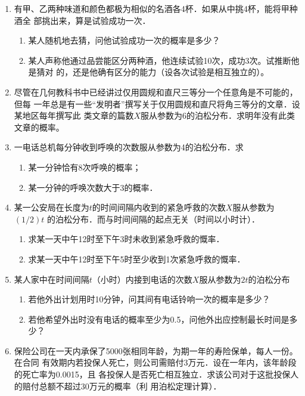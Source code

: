 \begin{enumerate}
    \item 有甲、乙两种味道和颜色都极为相似的名酒各4杯．如果从中挑4杯，能将甲种酒全
    部挑出来，算是试验成功一次．
    \begin{enumerate}
        \item 某人随机地去猜，问他试验成功一次的概率是多少？
        \item 某人声称他通过品尝能区分两种酒，他连续试验10次，成功3次。试推断他是猜对
        的，还是他确有区分的能力（设各次试验是相互独立的）。 
    \end{enumerate}


    \item 尽管在几何教科书中已经讲过仅用圆规和直尺三等分一个任意角是不可能的，但每
    一年总是有一些“发明者”撰写关于仅用圆规和直尺将角三等分的文章．设某地区每年撰写此
    类文章的篇数$X$服从参数为6的泊松分布．求明年没有此类文章的概率。


    \item 一电话总机每分钟收到呼唤的次数服从参数为4的泊松分布．求
    \begin{enumerate}
        \item 某一分钟恰有8次呼唤的概率；
        \item 某一分钟的呼唤次数大于3的概率．
    \end{enumerate}


    \item 某一公安局在长度为$t$的时间间隔内收到的紧急呼救的次数$X$服从参数为$(1/2)t$
    的泊松分布．而与时间间隔的起点无关（时间以小时计）．
    \begin{enumerate}
        \item 求某一天中午12时至下午3时未收到紧急呼救的慨率．
        \item 求某一天中午12时至下午5时至少收到1次紧急呼救的慨率．
    \end{enumerate}



    \item 某人家中在时间间隔$t$（小时）内接到电话的次数$X$服从参数为$2t$的泊松分布
    \begin{enumerate}
        \item 若他外出计划用时10分钟，问其间有电话铃响一次的概率是多少？
        \item 若他希望外出时没有电话的概率至少为0.5，问他外出应控制最长时间是多少？
    \end{enumerate}



    \item 保险公司在一天内承保了5000张相同年龄，为期一年的寿险保单，每人一份。在合同
    有效期内若投保人死亡，则公司需赔付3万元．设在一年内，该年龄段的死亡率为0.0015，且
    各投保人是否死亡相互独立．求该公司对于这批投保人的赔付总额不超过30万元的概率（利
    用泊松定理计算）．


\end{enumerate}
